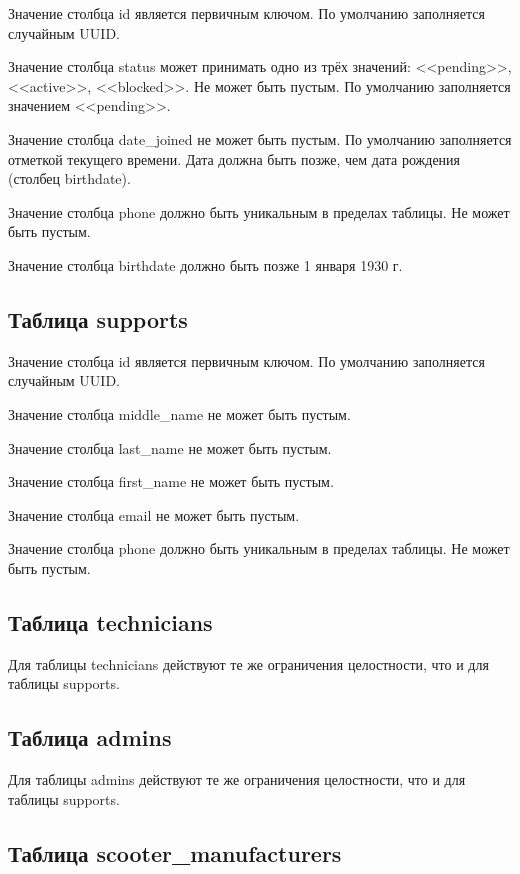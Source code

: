 Значение столбца id является первичным ключом. По умолчанию заполняется случайным UUID.

Значение столбца status может принимать одно из трёх значений: <<pending>>, <<active>>, <<blocked>>. Не может быть пустым. По умолчанию заполняется значением <<pending>>.

Значение столбца date\_joined не может быть пустым. По умолчанию заполняется отметкой текущего времени. Дата должна быть позже, чем дата рождения (столбец birthdate).

Значение столбца phone должно быть уникальным в пределах таблицы. Не может быть пустым.

Значение столбца birthdate должно быть позже 1 января 1930 г.

\subsection{Таблица supports}

Значение столбца id является первичным ключом. По умолчанию заполняется случайным UUID.

Значение столбца middle\_name не может быть пустым.

Значение столбца last\_name не может быть пустым.

Значение столбца first\_name не может быть пустым.

Значение столбца email не может быть пустым.

Значение столбца phone должно быть уникальным в пределах таблицы. Не может быть пустым.

\subsection{Таблица technicians}

Для таблицы technicians действуют те же ограничения целостности, что и для таблицы supports.

\subsection{Таблица admins}

Для таблицы admins действуют те же ограничения целостности, что и для таблицы supports.

\subsection{Таблица scooter\_manufacturers}

